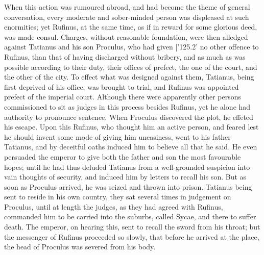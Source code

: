 When this action was rumoured abroad, and had become the theme of general
conversation, every moderate and sober-minded person was displeased at such
enormities; yet Rufinus, at the same time, as if in reward for some glorious
deed, was made consul. Charges, without reasonable foundation, were then
alledged against Tatianus and his son Proculus, who had given |'125.2'
no other offence to Rufinus, than that of having discharged without
bribery, and as much as was possible according to their duty, their offices of
prefect, the one of the court, and the other of the city. To effect what
was designed against them, Tatianus, being first deprived of his office, was
brought to trial, and Rufinus was appointed prefect of the imperial court.
Although there were apparently other persons commissioned to sit as judges in
this process besides Rufinus, yet he alone had authority to pronounce
sentence. When Proculus discovered the plot, he effeted his escape.
Upon this Rufinus, who thought him an active person, and feared lest he should
invent some mode of giving him uneasiness, went to his father Tatianus, and by
deceitful oaths induced him to believe all that he said. He even persuaded
the emperor to give both the father and son the most favourable hopes; until he
had thus deluded Tatianus from a well-grounded suspicion into vain thoughts of
security, and induced him by letters to recall his son. But as soon as
Proculus arrived, he was seized and thrown into prison. Tatianus being
sent to reside in his own country, they sat several times in judgement on
Proculus, until at length the judges, as they had agreed with Rufinus, commanded
him to be carried into the suburbs, called Sycae, and there to suffer
death. The emperor, on hearing this, sent to recall the sword from his
throat; but the messenger of Rufinus proceeded so slowly, that before he arrived
at the place, the head of Proculus was severed from his body.

